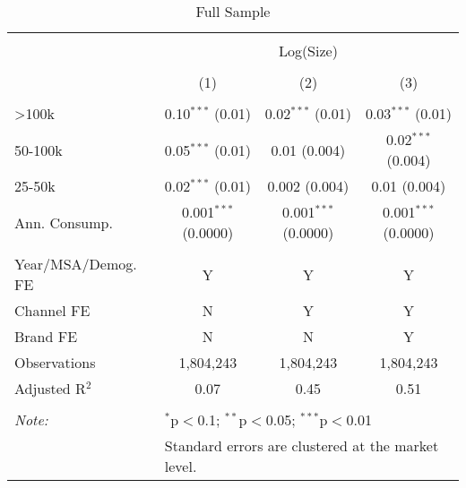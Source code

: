 
\begin{table}[!htbp] \centering 
  \caption{Full Sample} 
  \label{tab:packageSizeFullDetergent} 
\begin{tabular}{@{\extracolsep{5pt}}lccc} 
\\[-1.8ex]\hline 
\hline \\[-1.8ex] 
 & \multicolumn{3}{c}{Log(Size)} \\ 
\\[-1.8ex] & (1) & (2) & (3)\\ 
\hline \\[-1.8ex] 
 >100k & 0.10$^{***}$ (0.01) & 0.02$^{***}$ (0.01) & 0.03$^{***}$ (0.01) \\ 
  50-100k & 0.05$^{***}$ (0.01) & 0.01 (0.004) & 0.02$^{***}$ (0.004) \\ 
  25-50k & 0.02$^{***}$ (0.01) & 0.002 (0.004) & 0.01 (0.004) \\ 
  Ann. Consump. & 0.001$^{***}$ (0.0000) & 0.001$^{***}$ (0.0000) & 0.001$^{***}$ (0.0000) \\ 
 \hline \\[-1.8ex] 
Year/MSA/Demog. FE & Y & Y & Y \\ 
Channel FE & N & Y & Y \\ 
Brand FE & N & N & Y \\ 
Observations & 1,804,243 & 1,804,243 & 1,804,243 \\ 
Adjusted R$^{2}$ & 0.07 & 0.45 & 0.51 \\ 
\hline 
\hline \\[-1.8ex] 
\textit{Note:}  & \multicolumn{3}{l}{$^{*}$p$<$0.1; $^{**}$p$<$0.05; $^{***}$p$<$0.01} \\ 
 & \multicolumn{3}{l}{Standard errors are clustered at the market level.} \\ 
\end{tabular} 
\end{table} 
